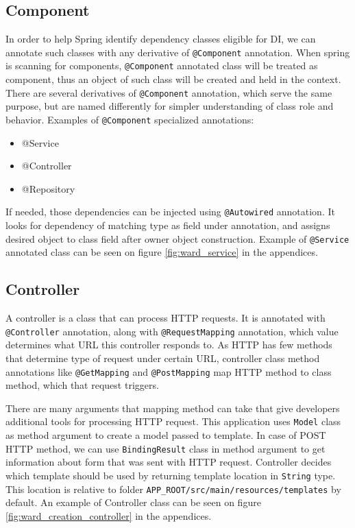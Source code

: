 \documentclass[a4paper,twoside,12pt]{book}
\begin{document}
    \subsection{Component}
      In order to help Spring identify dependency classes eligible for DI, we can annotate such classes with any derivative of \lstinline|@Component| annotation.
      When spring is scanning for components, \lstinline|@Component| annotated class will be treated as component, thus an object of such class will be created and held in the context.
      There are several derivatives of \lstinline|@Component| annotation, which serve the same purpose, but are named differently for simpler understanding of class role and behavior.
      Examples of \lstinline|@Component| specialized annotations:
      \begin{itemize}
        \item @Service
        \item @Controller
        \item @Repository
      \end{itemize}
      If needed, those dependencies can be injected using \lstinline|@Autowired| annotation.
      It looks for dependency of matching type as field under annotation, and assigns desired object to class field after owner object construction.
      Example of \lstinline|@Service| annotated class can be seen on figure \ref{fig:ward_service} in the appendices.

    \subsection{Controller}
      A controller is a class that can process HTTP requests. It is annotated with \lstinline|@Controller| annotation, along with \lstinline|@RequestMapping| annotation, 
      which value determines what URL this controller responds to.
      As HTTP has few methods that determine type of request under certain URL, controller class method annotations like \lstinline|@GetMapping| and \lstinline|@PostMapping|
      map HTTP method to class method, which that request triggers.

      There are many arguments that mapping method can take that give developers additional tools for processing HTTP request.
      This application uses \lstinline|Model| class as method argument to create a model passed to template.
      In case of POST HTTP method, we can use \lstinline|BindingResult| class in method argument to get information about form that was sent with HTTP request.
      Controller decides which template should be used by returning template location in \lstinline|String| type.
      This location is relative to folder \lstinline[language=bash]|APP_ROOT/src/main/resources/templates| by default.
      An example of Controller class can be seen on figure \ref{fig:ward_creation_controller} in the appendices.
\end{document}
